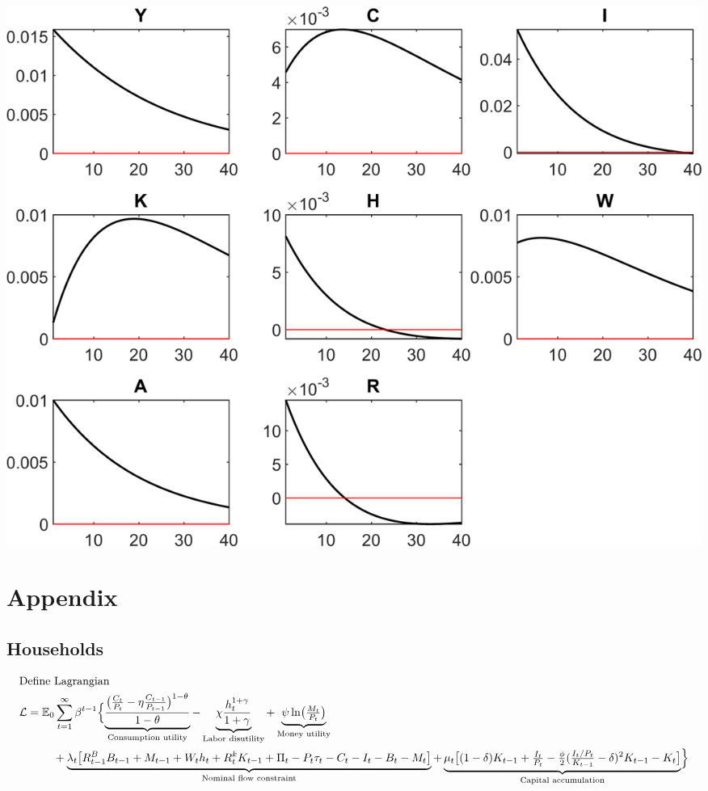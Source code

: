\documentclass[11pt,preprint]{elsarticle}
\let\origfigure\figure
\let\endorigfigure\endfigure
\renewenvironment{figure}[1][2] {
    \expandafter\origfigure\expandafter[H]
} {
    \endorigfigure
}
\numberwithin{equation}{section}
\numberwithin{figure}{section}
\numberwithin{table}{section}
\begin{document}
\begin{figure}
\centering
\includegraphics{code/rbc_model/rbc_model/graphs/rbc_model_IRF_eps_cropped.png}
\caption{image}
\end{figure}

\newpage
\newpage

\section{Appendix}\label{appendix}

\subsection{Households}\label{households-1}

\begin{align*}
  & \text{Define Lagrangian} \\
  & \mathcal{L} = \mathbb{E}_0 \sum_{t=1}^{\infty} \beta^{t-1} \Bigl\{
    \underbrace{\frac{\bigl(\tfrac{C_t}{P_t}-\eta\tfrac{C_{t-1}}{P_{t-1}}\bigr)^{1-\theta}}{1-\theta}}_{\text{Consumption utility}}
    - \underbrace{\chi\frac{h_t^{1+\gamma}}{1+\gamma}}_{\text{Labor disutility}}
    + \underbrace{\psi\ln\bigl(\tfrac{M_t}{P_t}\bigr)}_{\text{Money utility}} \\
  & \quad\qquad
    + \underbrace{\lambda_t\bigl[R^B_{t-1}B_{t-1}+M_{t-1}+W_th_t+R^k_tK_{t-1}+\Pi_t-P_t\tau_t-C_t-I_t-B_t-M_t\bigr]}_{\text{Nominal flow constraint}}
    + \underbrace{\mu_t\bigl[(1-\delta)K_{t-1}+\tfrac{I_t}{P_t}-\tfrac{\phi}{2}(\tfrac{I_t/P_t}{K_{t-1}}-\delta)^2K_{t-1}-K_t\bigr]}_{\text{Capital accumulation}}
  \Bigr\}
\end{align*}
\end{document}
